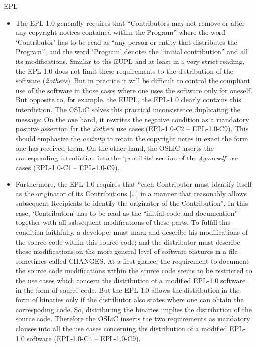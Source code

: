 \begin{license}{EPL}
\begin{itemize}
  \item The EPL-1.0 generally requires that \enquote{Contributors may not remove or
    alter any copyright notices contained within the Program} where
    the word `Contributor' has to be read as \enquote{any person or entity that
    distributes the Program}, and the word `Program' denotes the
    \enquote{initial contribution} and all its modifications. 
    Similar to the EUPL and at least in a very strict reading, the EPL-1.0 does not
    limit these requirements to the distribution of the software
    (\emph{2others}). But in practice it will be difficult to control the
    compliant use of the software in those cases where one uses the software
    only for oneself. But opposite to, for example, the EUPL, the EPL-1.0 clearly
    contains this interdiction. The OSLiC solves this practical inconsistence
    duplicating the message: On the one hand, it rewrites the negative condition
    as a mandatory positive assertion for the \emph{2others} use cases (EPL-1.0-C2 --
    EPL-1.0-C9). This should emphasize the \emph{activity} to retain the copyright
    notes in exact the form one has received them. On the other hand, the OSLiC
    inserts the corresponding interdiction into the `prohibits' section of the
    \emph{4yourself} use cases (EPL-1.0-C1 -- EPL-1.0-C9).
  
  \item Furthermore, the EPL-1.0 requires that \enquote{each Contributor must
    identify itself as the originator of its Contributions [\ldots] in a manner
    that reasonably allows subsequent Recipients to identify the originator of
    the Contribution}, In this case, `Contribution' has to be read
    as the \enquote{initial code and documention} together with all subsequent
    modifications of these parts. To fulfill this condition
    faithfully, a developer must mark and describe his modifications of the
    source code within this source code; and the distributor must describe these
    modifications on the more general level of software features in a file
    sometimes called CHANGES. At a first glance, the requirement to document the
    source code modifications within the source code seems to be restricted to
    the use cases which concern the distribution of a modified EPL-1.0 software in
    the form of source code. But the EPL-1.0 allows the distribution in the form of
    binaries only if the distributor also states where one can obtain the
    correspoding code. So, distributing the binaries implies the
    distribution of the source code.  Therefore the OSLiC inserts the two
    requirements as mandatory clauses into all the use cases concerning the
    distribution of a modified EPL-1.0 software (EPL-1.0-C4 -- EPL-1.0-C9).
  

\end{itemize}
\end{license}

